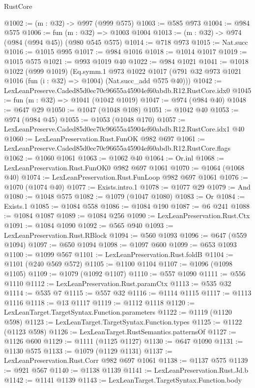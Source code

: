 \begin{lexlean}{RustCore}
\begin{coremodule}
@1002 := (m : @32) -> @997 (@999 @575)
@1003 := @585 @973
@1004 := @984 @575
@1006 := fun (m : @32) => @1003 @1004
@1013 := (m : @32) -> @974 (@984 (@994 @45)) (@980 @545 @575)
@1014 := @718 @973
@1015 := Nat.succ
@1016 := @1015 @995
@1017 := @984 @1016
@1018 := @1014 @1017
@1019 := @1015 @575
@1021 := @993 @1019 @40
@1022 := @984 @1021
@1041 := @1018
    @1022
    (@999 @1019)
    (Eq.symm.{1}
      @973
      @1022
      @1017
      (@791 @32 @973 @1021 @1016 (fun (i : @32) => @1004) (Nat.succ_add @575 @40)))
@1042 := LexLeanPreserve.Caded85d0ec70c96655a45904ef60abdb.R12.RustCore.idx0
@1045 := fun (m : @32) => @1041 (@1042 @1019)
@1047 := @974 (@984 @40)
@1048 := @647 @29
@1050 := @1047 (@1048 @108)
@1051 := @1042 @40
@1053 := @974 (@984 @45)
@1055 := @1053 (@1048 @170)
@1057 := LexLeanPreserve.Caded85d0ec70c96655a45904ef60abdb.R12.RustCore.idx1 @40
@1060 := LexLeanPreservation.Rust.FunOK @982 @697
@1061 := LexLeanPreserve.Caded85d0ec70c96655a45904ef60abdb.R12.RustCore.flags
@1062 := @1060 @1061
@1063 := @1062 @40
@1064 := Or.inl
@1068 := LexLeanPreservation.Rust.FunOK0 @982 @697 @1061
@1070 := @1064 (@1068 @40)
@1074 := LexLeanPreservation.Rust.FunLoop @982 @697 @1061
@1076 := @1070 (@1074 @40)
@1077 := Exists.intro.{1}
@1078 := @1077 @29
@1079 := And
@1080 := @1048 @575
@1082 := @1079 (@1047 @1080)
@1083 := Or
@1084 := Exists.{1}
@1085 := @1084 @558
@1086 := @1084 @190
@1087 := @6 @241
@1088 := @1084 @1087
@1089 := @1084 @256
@1090 := LexLeanPreservation.Rust.Ctx
@1091 := @1084 @1090
@1092 := @565 @940
@1093 := LexLeanPreservation.Rust.RBlock
@1094 := @560 @1093
@1096 := @647 (@559 @1094)
@1097 := @650 @1094
@1098 := @1097 @600
@1099 := @653 @1093
@1100 := @1099 @567
@1101 := LexLeanPreservation.Rust.foldB
@1104 := @1101 (@240 @569 @572)
@1105 := @1100 @1104
@1107 := @1096 (@1098 @1105)
@1109 := @1079 (@1092 @1107)
@1110 := @557 @1090
@1111 := @556 @1110
@1112 := LexLeanPreservation.Rust.paramCtx
@1113 := @535 @32
@1114 := @535 @7
@1115 := @557 @32
@1116 := @1114 @1115
@1117 := @1113 @1116
@1118 := @13 @1117
@1119 := @1112 @1118
@1120 := LexLeanTarget.TargetSyntax.Function.parameters
@1122 := @1119 (@1120 @598)
@1123 := LexLeanTarget.TargetSyntax.Function.types
@1125 := @1122 (@1123 @598)
@1126 := LexLeanTarget.RustSemantics.patternsOf
@1127 := @1126 @600
@1129 := @1111 (@1125 @1127)
@1130 := @647 @1090
@1131 := @1130 @575
@1133 := @1079 (@1129 @1131)
@1137 := LexLeanPreservation.Rust.Corr @982 @697 @1061
@1138 := @1137 @575
@1139 := @921 @567
@1140 := @1138 @1139
@1141 := LexLeanPreservation.Rust.Jd.b
@1142 := @1141 @1139
@1143 := LexLeanTarget.TargetSyntax.Function.body

\end{coremodule}
\end{lexlean}
